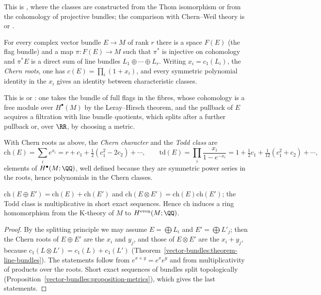 This is \cite[Chapter 14]{milnor-stasheff}, where the classes are constructed from the Thom isomorphism or from the cohomology of projective bundles; the comparison with Chern--Weil theory is
\cite[Appendix C]{milnor-stasheff} or \cite[Chapter 1]{griffiths-harris}.

\begin{theorem}\label{characteristic-classes:theorem-splitting}
For every complex vector bundle $E \to M$ of rank $r$ there is a space $F(E)$ (the flag bundle) and a map $\pi \colon F(E) \to M$ such that $\pi^*$ is injective on cohomology and $\pi^*E$ is a direct sum of line
bundles $L_1 \oplus \cdots \oplus L_r$. Writing $x_i = c_1(L_i)$, the \emph{Chern roots}, one has $c(E) = \prod_i(1 + x_i)$, and every symmetric polynomial identity in the $x_i$ gives an identity between
characteristic classes.
\end{theorem}

This is \cite[Chapter 21]{bott-tu} or \cite[Chapter 14]{milnor-stasheff}: one takes the bundle of full flags in the fibres, whose cohomology is a free module over $H^\bullet(M)$ by the Leray--Hirsch
theorem, and the pullback of $E$ acquires a filtration with line bundle quotients, which splits after a further pullback or, over $\RR$, by choosing a metric.

\begin{definition}\label{characteristic-classes:definition-chern-character}
With Chern roots as above, the \emph{Chern character} and the \emph{Todd class} are
\[
\mathrm{ch}(E) = \sum_ie^{x_i} = r + c_1 + \tfrac12(c_1^2 - 2c_2) + \cdots, \qquad \mathrm{td}(E) = \prod_i\frac{x_i}{1 - e^{-x_i}} = 1 + \tfrac12c_1 + \tfrac{1}{12}(c_1^2 + c_2) + \cdots,
\]
elements of $H^\bullet(M; \QQ)$, well defined because they are symmetric power series in the roots, hence polynomials in the Chern classes.
\end{definition}

\begin{proposition}\label{characteristic-classes:proposition-chern-character}
$\mathrm{ch}(E \oplus E') = \mathrm{ch}(E) + \mathrm{ch}(E')$ and $\mathrm{ch}(E \otimes E') = \mathrm{ch}(E)\mathrm{ch}(E')$; the Todd class is multiplicative in short exact sequences. Hence $\mathrm{ch}$ induces a
ring homomorphism from the K-theory of $M$ to $H^{\mathrm{even}}(M; \QQ)$.
\end{proposition}

\begin{proof}
By the splitting principle we may assume $E = \bigoplus L_i$ and $E' = \bigoplus L'_j$; then the Chern roots of $E \oplus E'$ are the $x_i$ and $y_j$, and those of $E \otimes E'$ are the $x_i + y_j$, because
$c_1(L \otimes L') = c_1(L) + c_1(L')$ (Theorem~\ref{vector-bundles:theorem-line-bundles}). The statements follow from $e^{x+y} = e^xe^y$ and from multiplicativity of products over the roots. Short exact
sequences of bundles split topologically (Proposition~\ref{vector-bundles:proposition-metrics}), which gives the last statements.
\end{proof}

